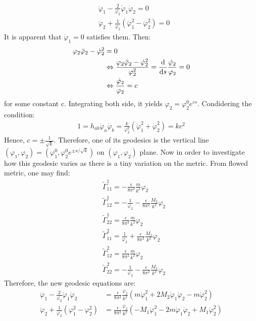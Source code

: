 \begin{align}[left=\empheqlbrace]
    &\ddot \varphi_{1} - \frac{2}{\varphi_{2}} \dot \varphi_{1} \dot \varphi _{2} = 0 \\
    &\ddot \varphi _{2} + \frac{1}{\varphi _{2}} (\dot \varphi_{1}^{2} - \dot \varphi _{2} ^{2} ) = 0
\end{align}
It is apparent that $\dot \varphi _{1} = 0$ satisfies them. Then:
\begin{align}
    \varphi_{2} \ddot \varphi_{2} - \dot \varphi_{2}^{2} &=0 \nonumber \\
    &\Leftrightarrow \frac{\varphi_{2} \ddot \varphi_{2} - \dot \varphi_{2}^{2}}{\varphi_{2}^{2}} = \dv{s} \frac{\dot \varphi_{2}}{ \varphi_{2}} =0 \nonumber \\
    &\Leftrightarrow \frac{\dot \varphi_{2}}{\varphi_{2}} = c
\end{align}
for some constant c. Integrating both side, it yields $\varphi _{2} = \varphi_{2} ^{0} e^{cs}$. Condidering the condition:
\begin{align}
    1 = h_{ab} \dot \varphi _{a} \dot \varphi_{b} = \frac{k}{\varphi_{2} ^{2}} (\dot \varphi_{1} ^{2} + \dot \varphi_{2} ^{2}) = kc^{2}
\end{align}
Hence, $c= \pm \frac{1}{\sqrt{k}}$. Therefore, one of its geodesics is the vertical line $(\varphi_{1}, \varphi_{2}) = (\varphi_{1}^{0}, \varphi_{2}^{0} e^{\pm s/\sqrt{k}})$ on $(\varphi_{1}, \varphi_{2})$ plane. Now in order to investigate how this geodesic varies as there is a tiny variation on the metric. From flowed metric, one may find:
\begin{align}
    &\tilde \Gamma_{11}^{1} = -\frac{\epsilon}{8\pi^{2}} \frac{m}{k^2}\varphi_{2} \\
    &\tilde \Gamma _{12} ^{1} = -\frac{1}{\varphi_{2}} -\frac{\epsilon}{8\pi^{2}}\frac{M_2}{k^2}\varphi_{2} \\
    &\tilde \Gamma _{22}^{1} = \frac{\epsilon}{8\pi^{2}} \frac{m}{k^2} \varphi_{2} \\
    &\tilde \Gamma _{11} ^{2} = \frac{1}{\varphi_{2}} + \frac{\epsilon}{8\pi^{2}}\frac{M_{1}}{k^{2}}\varphi_{2}\\
    &\tilde \Gamma _{12} ^{2} = \frac{\epsilon}{8\pi ^{2}} \frac{m}{k^{2}}\varphi_{2} \\
    &\tilde \Gamma _{22} ^{2} = -\frac{1}{\varphi_{2}} -\frac{\epsilon}{8\pi^{2}}\frac{M_1}{k^{2}}\varphi_{2}
\end{align}
Therefore, the new geodesic equations are:
\begin{align}[left=\empheqlbrace]
    \label{eq:2.79}
    \ddot \varphi_{1} - \frac{2}{\varphi_{2}} \dot \varphi_{1} \dot \varphi_{2} &= \frac{\epsilon}{8\pi ^{2}} \frac{\varphi_{2}}{k^{2}} (m\dot\varphi_{1}^{2} + 2M_{2} \dot \varphi_{1} \dot \varphi_{2} - m\dot \varphi_{2}^{2} )\\
    \label{eq:2.80}
    \ddot \varphi_{2} +\frac{1}{\varphi_{2}} (\varphi_{1} ^{2} - \varphi_{2}^{2}) &= \frac{\epsilon}{8\pi ^{2}}\frac{\varphi_{2}}{k^{2}}(-M_{1} \dot \varphi_{1}^{2} - 2m \dot \varphi_{1} \dot \varphi_{2} + M_{1} \dot \varphi_{2} ^{2})
\end{align}
